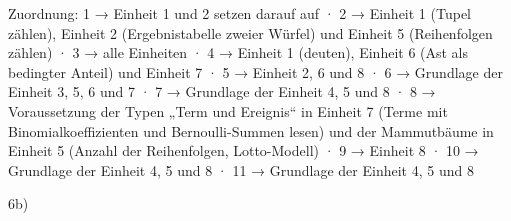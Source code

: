 
Zuordnung: 1 → Einheit 1 und 2 setzen darauf auf · 2 → Einheit 1 (Tupel zählen), Einheit 2 (Ergebnistabelle zweier Würfel) und Einheit 5 (Reihenfolgen zählen) · 3 → alle Einheiten · 4 → Einheit 1 (deuten), Einheit 6 (Ast als bedingter Anteil) und Einheit 7 · 5 → Einheit 2, 6 und 8 · 6 → Grundlage der Einheit 3, 5, 6 und 7 · 7 → Grundlage der Einheit 4, 5 und 8 · 8 → Voraussetzung der Typen „Term und Ereignis“ in Einheit 7 (Terme mit Binomialkoeffizienten und Bernoulli-Summen lesen) und der Mammutbäume in Einheit 5 (Anzahl der Reihenfolgen, Lotto-Modell) · 9 → Einheit 8 · 10 → Grundlage der Einheit 4, 5 und 8 · 11 → Grundlage der Einheit 4, 5 und 8


6b)


